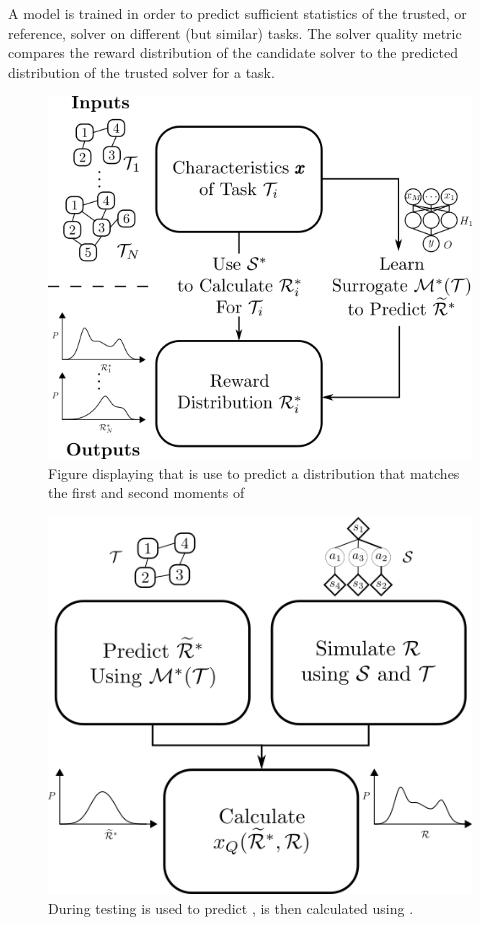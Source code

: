     A model is trained in order to predict sufficient statistics of the trusted, or reference, solver \solvestar{} on different (but similar) tasks. The solver quality metric compares the reward distribution of the candidate solver to the predicted distribution of the trusted solver for a task.

    \begin{figure}[tbp]
        \centering
        \includegraphics[width=0.7\linewidth]{Figures/SQ_train.png}
        \caption{Figure displaying that \surrogate{} is use to predict a distribution  \rwdstariapprox{} that matches the first and second moments of \rwdstari}
        \label{fig:sq_train}
    \end{figure}%

    \begin{figure}[tbp]
        \centering
        \includegraphics[width=0.6\linewidth]{Figures/SQ_test.png}
        \caption{During testing \surrogate{} is used to predict \rwdstarapprox{}, \xQ{} is then calculated using \rwd{}.}
        \label{fig:sq_train}
    \end{figure}
